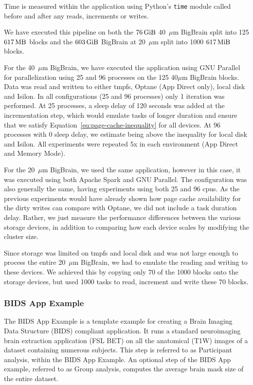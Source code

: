 \documentclass[conference]{IEEEtran}
\newcommand{\bigbrain}{BigBrain\xspace}
\begin{document}
Time is measured within the application using Python's \texttt{time} module 
called before and after any reads, increments or writes.

We have executed this pipeline on both the $\SI{76}{\gibi\byte}$ 40~$\mu$m 
\bigbrain split into 125 $\SI{617}{\mega\byte}$ blocks and the $\SI{603}{\gibi\byte}$
\bigbrain at 20~$\mu$m split into 1000 $\SI{617}{\mebi\byte}$ blocks.

For the 40~$\mu$m \bigbrain, we have executed the application using GNU Parallel for parallelization
using 25 and 96 processes on the 125 40$\mu$m \bigbrain blocks. Data was read and written to either
tmpfs, Optane (App Direct only), local disk and Isilon. In all configurations (25 and 96 processes)
only 1 iteration was performed. At 25 processes, a sleep delay of 120 seconds was added at the
incrementation step, which would emulate tasks of longer duration and ensure that we satisfy Equation~\ref{eq:page-cache-inequality} for all devices.
At 96 processes with 0 sleep delay, we estimate being above the inequality for local disk and Isilon.
All experiments were repeated 5x in each environment (App Direct and Memory Mode).

For the 20~$\mu$m \bigbrain, we used the same application, however in this case, it was executed
using both Apache Spark and GNU Parallel. The configuration was also generally the same, having 
experiments using both 25 and 96 cpus. As the previous experiments would have already shown how
page cache availability for the dirty writes can compare with Optane, we did not include
a task duration delay. Rather, we just measure the performance differences between the various
storage devices, in addition to comparing how each device scales by modifying the cluster size.

Since storage was limited on tmpfs and local disk and was not large enough to process the entire
20~$\mu$m \bigbrain, we had to emulate the reading and writing to these devices. We achieved this
by copying only 70 of the 1000 blocks onto the storage devices, but used 1000 tasks to read, increment and
write these 70 blocks.

\subsubsection{BIDS App Example}

The BIDS App Example is a template example for creating a Brain Imaging Data Structure (BIDS)
compliant application. It runs a standard neuroimaging brain extraction application (FSL BET) 
on all the anatomical (T1W) images of a dataset containing numerous subjects. This step is 
referred to as Participant analysis, within the BIDS App Example. An optional
step of the BIDS App example, referred to as Group analysis, computes the average brain
mask size of the entire dataset.
\end{document}
